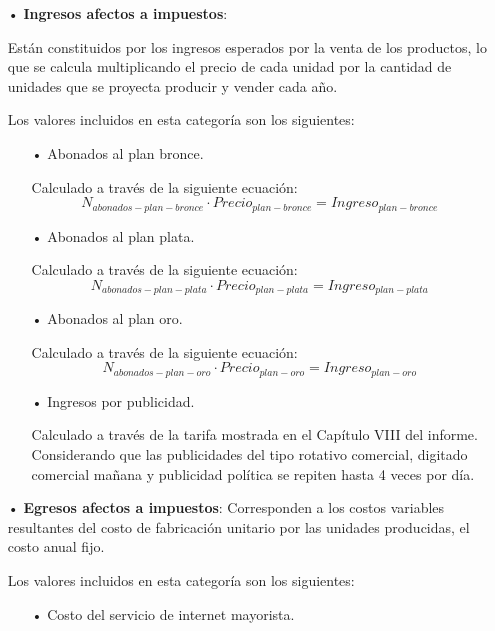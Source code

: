 \begin{enumerate}
\item[•]\textbf{Ingresos afectos a impuestos}:

Están constituidos por los ingresos esperados por la 
venta de los productos, lo que se calcula multiplicando el precio de cada unidad por 
la cantidad de unidades que se proyecta producir y vender cada año.

Los valores incluidos en esta categoría son los siguientes:
\begin{enumerate}
\item[•]Abonados al plan bronce.

Calculado a través de la siguiente ecuación:
\begin{equation}
N_{abonados-plan-bronce}\cdot Precio_{plan-bronce}=Ingreso_{plan-bronce}
\end{equation}

\item[•]Abonados al plan plata.

Calculado a través de la siguiente ecuación:
\begin{equation}
N_{abonados-plan-plata}\cdot Precio_{plan-plata}=Ingreso_{plan-plata}
\end{equation}

\item[•]Abonados al plan oro.

Calculado a través de la siguiente ecuación:
\begin{equation}
N_{abonados-plan-oro}\cdot Precio_{plan-oro}=Ingreso_{plan-oro}
\end{equation}

\item[•]Ingresos por publicidad.

Calculado a través de la tarifa mostrada en el Capítulo VIII del informe. Considerando que las publicidades del tipo
rotativo comercial, digitado comercial mañana y publicidad política se repiten hasta 4 veces por día.

\end{enumerate}

\item[•]\textbf{Egresos afectos a impuestos}:
Corresponden a los costos variables resultantes del 
costo de fabricación unitario por las unidades producidas, el costo anual fijo.

Los valores incluidos en esta categoría son los siguientes:
\begin{enumerate}
\item[•]Costo del servicio de internet mayorista.


\end{enumerate}
\end{enumerate}
